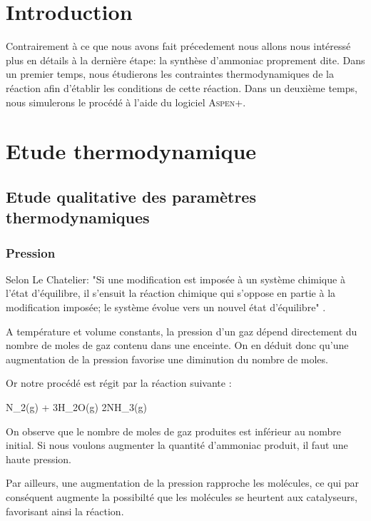 

\section{Introduction}
Contrairement à ce que nous avons fait précedement nous allons nous intéressé
plus en détails à la dernière étape: la synthèse d'ammoniac proprement dite.
Dans un premier temps, nous étudierons les contraintes thermodynamiques de 
la réaction afin d'établir les conditions de cette réaction.
Dans un deuxième temps, nous simulerons le procédé à l'aide du logiciel
\textsc{Aspen+}.

\section{Etude thermodynamique}

\subsection{Etude qualitative des paramètres thermodynamiques }

\subsubsection{Pression}
Selon Le Chatelier: "Si une modification est imposée à un système chimique à 
l'état d'équilibre, il s'ensuit la réaction chimique qui s'oppose en partie
à la modification imposée; le système évolue vers un nouvel état d'équilibre"
\cite{LeChatelier}.

A température et volume constants, la pression d'un gaz dépend directement
du nombre de moles de gaz contenu dans une enceinte. On en déduit donc qu'une
augmentation de la pression favorise une diminution du nombre de moles.

Or notre procédé est régit par la réaction suivante :
\begin{chemmath} 
	N_2(g) + 3H_{2}O(g) \longrightarrow 2NH_3(g)
\end{chemmath} 

On observe que le nombre de moles de gaz produites est inférieur au nombre 
initial. Si nous voulons augmenter la quantité d'ammoniac produit, il faut 
une haute pression. 

Par ailleurs, une augmentation de la pression rapproche les molécules, ce qui
par conséquent augmente la possibilté que les molécules se heurtent aux 
catalyseurs, favorisant ainsi la réaction.


